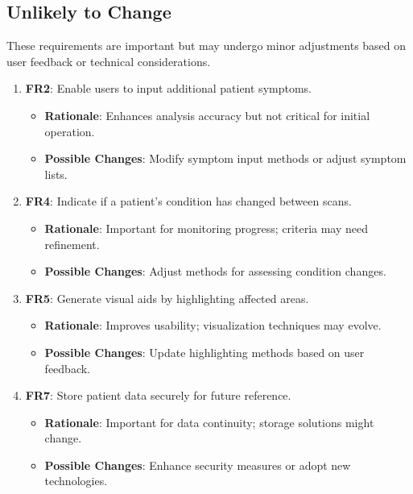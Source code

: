 \documentclass[12pt]{article}
\begin{document}
\subsection{Unlikely to Change}

These requirements are important but may undergo minor adjustments based on user feedback or technical considerations.

\begin{enumerate}[resume]
    \item \textbf{FR2}: Enable users to input additional patient symptoms.
    \begin{itemize}[label=-]
        \item \textbf{Rationale}: Enhances analysis accuracy but not critical for initial operation.
        \item \textbf{Possible Changes}: Modify symptom input methods or adjust symptom lists.
    \end{itemize}

    \item \textbf{FR4}: Indicate if a patient's condition has changed between scans.
    \begin{itemize}[label=-]
        \item \textbf{Rationale}: Important for monitoring progress; criteria may need refinement.
        \item \textbf{Possible Changes}: Adjust methods for assessing condition changes.
    \end{itemize}

    \item \textbf{FR5}: Generate visual aids by highlighting affected areas.
    \begin{itemize}[label=-]
        \item \textbf{Rationale}: Improves usability; visualization techniques may evolve.
        \item \textbf{Possible Changes}: Update highlighting methods based on user feedback.
    \end{itemize}

    \item \textbf{FR7}: Store patient data securely for future reference.
    \begin{itemize}[label=-]
        \item \textbf{Rationale}: Important for data continuity; storage solutions might change.
        \item \textbf{Possible Changes}: Enhance security measures or adopt new technologies.
    \end{itemize}


\end{enumerate}
\end{document}
